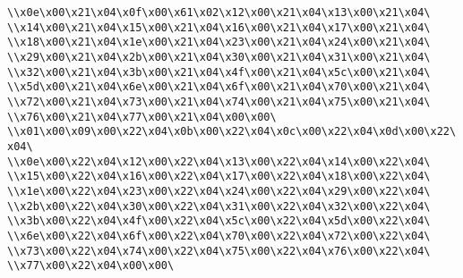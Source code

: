 \verb|\\x0e\x00\x21\x04\x0f\x00\x61\x02\x12\x00\x21\x04\x13\x00\x21\x04\|\newline
\verb|\\x14\x00\x21\x04\x15\x00\x21\x04\x16\x00\x21\x04\x17\x00\x21\x04\|\newline
\verb|\\x18\x00\x21\x04\x1e\x00\x21\x04\x23\x00\x21\x04\x24\x00\x21\x04\|\newline
\verb|\\x29\x00\x21\x04\x2b\x00\x21\x04\x30\x00\x21\x04\x31\x00\x21\x04\|\newline
\verb|\\x32\x00\x21\x04\x3b\x00\x21\x04\x4f\x00\x21\x04\x5c\x00\x21\x04\|\newline
\verb|\\x5d\x00\x21\x04\x6e\x00\x21\x04\x6f\x00\x21\x04\x70\x00\x21\x04\|\newline
\verb|\\x72\x00\x21\x04\x73\x00\x21\x04\x74\x00\x21\x04\x75\x00\x21\x04\|\newline
\verb|\\x76\x00\x21\x04\x77\x00\x21\x04\x00\x00\|\newline
\verb|\\x01\x00\x09\x00\x22\x04\x0b\x00\x22\x04\x0c\x00\x22\x04\x0d\x00\x22\x04\|\newline
\verb|\\x0e\x00\x22\x04\x12\x00\x22\x04\x13\x00\x22\x04\x14\x00\x22\x04\|\newline
\verb|\\x15\x00\x22\x04\x16\x00\x22\x04\x17\x00\x22\x04\x18\x00\x22\x04\|\newline
\verb|\\x1e\x00\x22\x04\x23\x00\x22\x04\x24\x00\x22\x04\x29\x00\x22\x04\|\newline
\verb|\\x2b\x00\x22\x04\x30\x00\x22\x04\x31\x00\x22\x04\x32\x00\x22\x04\|\newline
\verb|\\x3b\x00\x22\x04\x4f\x00\x22\x04\x5c\x00\x22\x04\x5d\x00\x22\x04\|\newline
\verb|\\x6e\x00\x22\x04\x6f\x00\x22\x04\x70\x00\x22\x04\x72\x00\x22\x04\|\newline
\verb|\\x73\x00\x22\x04\x74\x00\x22\x04\x75\x00\x22\x04\x76\x00\x22\x04\|\newline
\verb|\\x77\x00\x22\x04\x00\x00\|\newline
